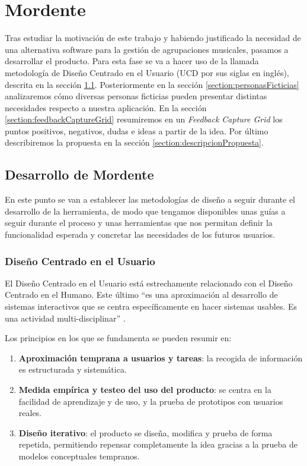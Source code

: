 \chapter{Mordente}

Tras estudiar la motivación de este trabajo y habiendo justificado la necesidad de una alternativa software para la gestión de agrupaciones musicales, pasamos a desarrollar el producto. Para esta fase se va a hacer uso de la llamada metodología de Diseño Centrado en el Usuario (UCD por sus siglas en inglés), descrita en la sección \ref{section:desarrolloMordente}. Posteriormente en la sección \ref{section:personasFicticias} analizaremos cómo diversas personas ficticias pueden presentar distintas necesidades respecto a nuestra aplicación. En la sección \ref{section:feedbackCaptureGrid} resumiremos en un \textit{Feedback Capture Grid} los puntos positivos, negativos, dudas e ideas a partir de la idea. Por último describiremos la propuesta en la sección \ref{section:descripcionPropuesta}.

\section{Desarrollo de Mordente}\label{section:desarrolloMordente}

En este punto se van a establecer las metodologías de diseño a seguir durante el desarrollo de la herramienta, de modo que tengamos disponibles unas guías a seguir durante el proceso y unas herramientas que nos permitan definir la funcionalidad esperada y concretar las necesidades de los futuros usuarios.

\subsection{Diseño Centrado en el Usuario}

El Diseño Centrado en el Usuario está estrechamente relacionado con el Diseño Centrado en el Humano\cite{w3UCD}. Este último ``es una aproximación al desarrollo de sistemas interactivos que se centra específicamente en hacer sistemas usables. Es una actividad multi-disciplinar'' \cite{isoHCD}.

Los principios\cite{jeffreyUCD} en los que se fundamenta se pueden resumir en:

\begin{enumerate}
    \item \textbf{Aproximación temprana a usuarios y tareas}: la recogida de información es estructurada y sistemática.
    \item \textbf{Medida empírica y testeo del uso del producto}: se centra en la facilidad de aprendizaje y de uso, y la prueba de prototipos con usuarios reales.
    \item \textbf{Diseño iterativo}: el producto se diseña, modifica y prueba de forma repetida, permitiendo repensar completamente la idea gracias a la prueba de modelos conceptuales tempranos.
\end{enumerate}

